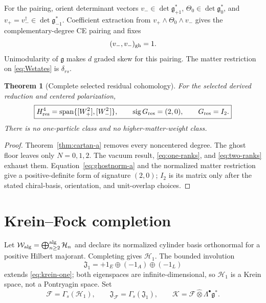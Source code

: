 \documentclass[11pt]{article}
\newtheorem{theorem}{Theorem}[section]
\theoremstyle{remark}
\newcommand{\g}{\mathfrak g}
\newcommand{\W}{\mathcal W}
\newcommand{\K}{\mathscr K}
\newcommand{\Hone}{\mathscr H_1}
\begin{document}
For the pairing, orient determinant vectors
$v_-\in\det\g_{+1}^*$, $\Theta_0\in\det\g_0^*$, and
$v_+=v_-^\dagger\in\det\g_{-1}^*$.  Coefficient extraction from
$v_+\wedge\Theta_0\wedge v_-$ gives the complementary-degree CE pairing and
fixes
\begin{equation}\label{eq:ghostnorm-a}
 (v_-,v_-)_{\rm gh}=1.
\end{equation}
Unimodularity of $\g$ makes $d$ graded skew for this pairing.  The matter
restriction on \eqref{eq:Wstates} is $\delta_{rs}$.

\begin{theorem}[Complete selected residual cohomology]\label{thm:main-a}
For the selected derived reduction and centered polarization,
\begin{equation}\label{eq:main-a}
 \boxed{
 H^4_{\rm res}
 =\operatorname{span}\{[W_+^2],[W_-^2]\},
 \qquad \operatorname{sig}G_{\rm res}=(2,0),
 \qquad G_{\rm res}=I_2.}
\end{equation}
There is no one-particle class and no higher-matter-weight class.
\end{theorem}

\begin{proof}
Theorem~\ref{thm:cartan-a} removes every noncentered degree.  The ghost floor
leaves only $N=0,1,2$.  The vacuum result, \eqref{eq:one-ranks}, and
\eqref{eq:two-ranks} exhaust them.  Equation~\eqref{eq:ghostnorm-a} and the
normalized matter restriction give a positive-definite form of signature
$(2,0)$; $I_2$ is its matrix only after the stated chiral-basis, orientation,
and unit-overlap choices.
\end{proof}

\section{Krein--Fock completion}

Let $\W_{\rm alg}=\bigoplus_{n\ge2}^{\rm alg}\mathcal H_n$ and declare its
normalized cylinder basis orthonormal for a positive Hilbert majorant.
Completing gives $\Hone$.  The bounded involution
\begin{equation}
 \mathfrak J_1=+1_E\oplus(-1_A)\oplus(-1_L)
\end{equation}
extends \eqref{eq:krein-one}; both eigenspaces are infinite-dimensional, so
$\Hone$ is a Krein space, not a Pontryagin space.  Set
\begin{equation}\label{eq:KreinFock}
 \mathscr F=\Gamma_s(\Hone),
 \qquad \mathfrak J_{\mathscr F}=\Gamma_s(\mathfrak J_1),
 \qquad \K=\mathscr F\widehat\otimes\Lambda^\bullet\g^*.
\end{equation}
\end{document}
